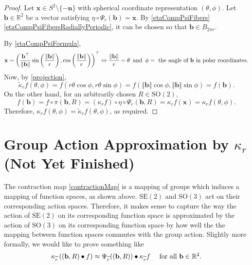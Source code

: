 \documentclass[a4paper,11pt]{scrartcl}
\numberwithin{dummy}{section}
\theoremstyle{plain}
\theoremstyle{plain}
\theoremstyle{plain}
\theoremstyle{plain}
\theoremstyle{nonumberplain}
\newtheorem{proof}{Proof}
\newcommand{\F}[1][R]{\mathbb{#1}} %
\newcommand{\Ltwonorm}[1]{\left\Vert #1 \right\Vert} %
\newcommand{\SE}{\mathrm{SE}}
\newcommand{\SO}{\mathrm{SO}}
\begin{document}
	\begin{proof}
		Let $ \mathbf{x} \in S^{2} \setminus \{ - \mathbf{n} \} $ with spherical coordinate representation $ (\theta, \phi) $. Let $ \mathbf{b} \in \F^{2} $ be a vector satisfying $ \eta \circ \Psi_{r} (\mathbf{b}) = \mathbf{x} $. By \cref{etaCompPsiFibers}\ref{etaCompPsiFibersRadiallyPeriodic}, it can be chosen so that $ \mathbf{b} \in B_{2 \pi r} $.  
		
		By \cref{etaCompPsiFormula}, 
		\begin{equation*}
		\mathbf{x}
		= \left( \frac{\mathbf{b}^{\top}}{\Ltwonorm{\mathbf{b}}} \sin \left(\frac{\Ltwonorm{\mathbf{b}}}{r}\right), \cos \left(\frac{\Ltwonorm{\mathbf{b}}}{r}\right) \right)^{\top}
		\Leftrightarrow
		\frac{\Ltwonorm{\mathbf{b}}}{r} = \theta
			\enskip \mbox{and} \enskip
			\phi = \mbox{ the angle of $ \mathbf{b} $ in polar coordinates.}
		\end{equation*}
		Now, by \eqref{projection}, 
		\begin{equation*}
		\widetilde{\kappa}_{r} f (\theta, \phi) 
		= f \left( r \theta \cos \phi, r \theta \sin \phi \right)
		= f \left( \Ltwonorm{\mathbf{b}} \cos \phi, \Ltwonorm{\mathbf{b}} \sin \phi \right)
		= f \left( \mathbf{b} \right).
		\end{equation*}
		On the other hand, for an arbitrarily chosen $ R \in \SO(2) $,
		\begin{equation*}
		f ( \mathbf{b} )
		= f \circ \pi (\mathbf{b}, R)
		= (\kappa_{r} f) \circ \eta \circ \Psi_{r} (\mathbf{b}, R)
		= \kappa_{r} f (\mathbf{x})
		= \kappa_{r} f (\theta, \phi).
		\end{equation*}
		Therefore, $ \kappa_{r} f(\theta, \phi) = \widetilde{\kappa}_{r} f (\theta, \phi) $, as required.
	\end{proof}
	
	\section{Group Action Approximation by $ \kappa_{r} $ (Not Yet Finished)}
	The contraction map \eqref{contractionMap} is a mapping of groups which induces a mapping of function spaces, as shown above. $ \SE(2) $ and $ \SO(3) $  act on their corresponding action spaces. Therefore, it makes sense to capture the way the action of $ \SE(2) $ on its corresponding function space is approximated by the action of $ \SO(3) $ on its corresponding function space by how well the the mapping between function spaces commutes with the group action. Slightly more formally, we would like to prove something like
	\begin{equation*}
	\kappa_{\widetilde{r}} \left( (\mathbf{b}, R) \bullet f \right) \approx \Psi_{\widetilde{r}} ((\mathbf{b}, R)) \bullet \kappa_{\widetilde{r}} f 
	\quad\mbox{ for all $ \mathbf{b} \in \F^{2} $}.
	\end{equation*}
	
\end{document}
